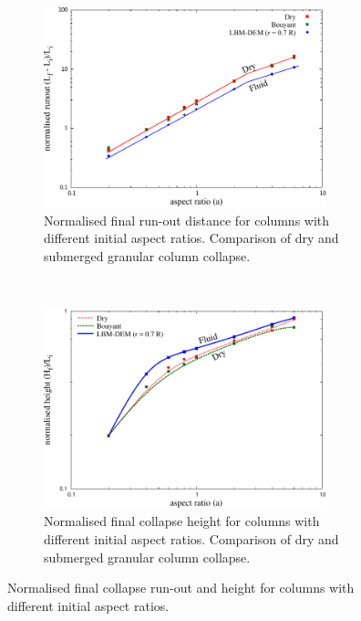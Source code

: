 \begin{figure}
	\centering
\begin{subfigure}[t]{0.9\textwidth}
	\centering
	\includegraphics[width=0.9\textwidth]{runoutf}
	\caption{Normalised final run-out distance for columns with different 
	initial aspect ratios. Comparison of dry and submerged granular column 
	collapse.}
	\label{fig:runoutf}
\end{subfigure}\\
\begin{subfigure}[t]{0.9\textwidth}
	\centering
	\includegraphics[width=0.9\textwidth]{Heightf}
	\caption{Normalised final collapse height for columns with different 
	initial aspect ratios. Comparison of dry and submerged granular column 
	collapse.}
	\label{fig:heightf}
\end{subfigure}
	\caption[Comparison of run-out and height between dry and submerged 
	collapse for columns with different initial aspect ratios]{Normalised final 
	collapse run-out and height for columns with 
	different initial aspect ratios.}
	\label{fig:height_runout_fluid}
\end{figure}


